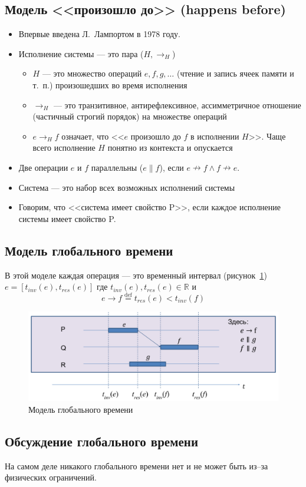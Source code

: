 \documentclass[10pt,a4paper,oneside,titlepage]{article}
\theoremstyle{plain}
\theoremstyle{defenition}
\begin{document}
\subsection{Модель <<произошло до>> (happens before)}
\begin{itemize}
	\item Впервые введена Л.~Лампортом в 1978 году.
	\item Исполнение системы --- это пара ($H, \to_H$)
	\begin{itemize}
		\item $H$ --- это множество операций $e, f, g, \ldots$ (чтение и запись ячеек памяти и т.~п.) произошедших во время исполнения
		\item $\to_H$ --- это транзитивное, антирефлексивное, ассимметричное отношение (частичный строгий порядок) на множестве операций
		\item $e\to_Hf$ означает, что <<$e$ произошло до $f$ в исполнении $H$>>. Чаще всего исполнение $H$ понятно из контекста и опускается 
	\end{itemize}
    \item Две операции $e$ и $f$ параллельны ($e\parallel f$), если $e\nrightarrow f\wedge f\nrightarrow e$.
    \item Система --- это набор всех возможных исполнений системы
    \item Говорим, что <<система имеет свойство P>>, если каждое исполнение системы имеет свойство P.
\end{itemize}

\subsection{Модель глобального времени}
В этой моделе каждая операция --- это временный интервал (рисунок~\ref{fig:model3}) $e=[t_{inv}(e), t_{res}(e)]$ где $t_{inv}(e), t_{res}(e)\in\mathbb{R}$ и
$$
e\to f\stackrel{\mathrm{def}}{=}t_{res}(e)<t_{inv}(f)
$$

\begin{figure}
	\centering
	\includegraphics[width=0.5\linewidth]{pictures/Model3}
	\caption{Модель глобального времени}
	\label{fig:model3}
\end{figure}

\subsection{Обсуждение глобального времени}
На самом деле никакого глобального времени нет и не может быть из--за физических ограничений.
\end{document}
